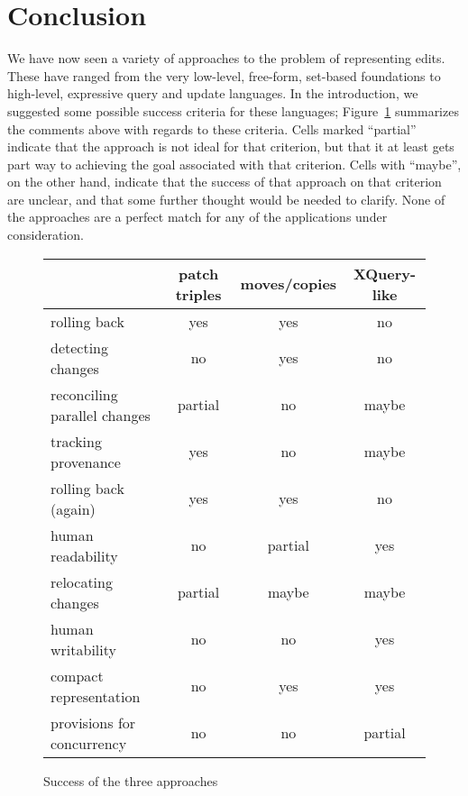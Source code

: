 \documentclass{article}
\newif\ifhighlightnew\highlightnewfalse
\newcommand{\yes}{\cellcolor{green!30}yes}
\newcommand{\no}{\cellcolor{red!20}no}
\newcommand{\maybe}{\cellcolor{orange!70!yellow!40}maybe}
\renewcommand{\partial}{\cellcolor{yellow!30}partial}
\newenvironment{newcontent}{\ifhighlightnew\color{green!55!black}[new]\fi}{\ifhighlightnew\color{black}\fi}
\begin{document}
\section{Conclusion}
\label{sec:conclusion}
We have now seen a variety of approaches to the problem of representing
edits. These have ranged from the very low-level, free-form, set-based
foundations to high-level, expressive query and update languages. In the
introduction, we suggested some possible success criteria for these
languages; Figure~\ref{fig:success} summarizes the comments above with
regards to these criteria.
\begin{newcontent}%
Cells marked ``partial'' indicate that the approach is not ideal for that
criterion, but that it at least gets part way to achieving the goal
associated with that criterion. Cells with ``maybe'', on the other hand,
indicate that the success of that approach on that criterion are unclear,
and that some further thought would be needed to clarify. None of the
approaches are a perfect match for any of the applications under
consideration.

\begin{figure}
    \begin{center}
        \begin{tabular}{l|ccc}
        & patch triples & moves/copies & XQuery-like \\
        \hline
        rolling back                    & \yes      & \yes      & \no    \\
        detecting changes               & \no       & \yes      & \no    \\
        reconciling parallel changes    & \partial  & \no       & \maybe \\
        tracking provenance             & \yes      & \no       & \maybe \\
        \hline
        rolling back (again)            & \yes      & \yes      & \no    \\
        human readability               & \no       & \partial  & \yes   \\
        relocating changes              & \partial  & \maybe    & \maybe \\
        \hline
        human writability               & \no       & \no       & \yes   \\
        compact representation          & \no       & \yes      & \yes   \\
        provisions for concurrency      & \no       & \no       & \partial\\
        \hline
        \end{tabular}
    \end{center}
    \caption{Success of the three approaches}
    \label{fig:success}
\end{figure}


\end{newcontent}
\end{document}
